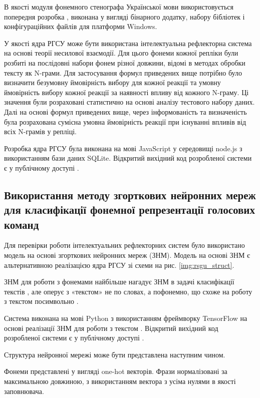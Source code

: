 В якості модуля фонемного стенографа Української мови використовується попередня розробка \cite{Pylypenko_2008}, виконана у вигляді бінарного додатку, набору бібліотек і конфігураційних файлів для платформи Windows.

У якості ядра РГСУ може бути використана інтелектуальна рефлекторна система на основі теорії несилової взаємодії. Для цього фонеми кожної репліки були розбиті на послідовні набори фонем різної довжини, відомі в методах обробки тексту як N-грами. Для застосування формул приведених вище потрібно було визначити безумовну ймовірність вибору для кожної реакції та умовну ймовірність вибору кожної реакції за наявності впливу від кожного N-граму. Ці значення були розраховані статистично на основі аналізу тестового набору даних. Далі на основі формул приведених вище, через інформованість та визначеність була розрахована сумісна умовна ймовірність реакції при існуванні впливів від всіх N-грамів у репліці.

Розробка ядра РГСУ була виконана на мові JavaScript у середовищі node.js з використанням бази даних SQLite. Відкритий вихідний код розробленої системи є у публічному доступі \cite{code1}.

\subsection{Використання методу згорткових нейронних мереж для класифікації фонемної репрезентації голосових команд}

Для перевірки роботи інтелектуальних рефлекторних систем було використано модель на основі згорткових нейронних мереж (ЗНМ). Модель на основі ЗНМ є альтернативною реалізацією ядра РГСУ зі схеми на рис. \ref{img:rsgu_struct}.

ЗНМ для роботи з фонемами найбільше нагадує ЗНМ в задачі класифікації текстів \cite{Kim_2014}, але оперує з «текстом» не по словах, а пофонемно, що схоже на роботу з текстом посимвольно \cite{Zhang_2016}.

Система виконана на мові Python з використанням фреймворку TensorFlow на основі реалізації ЗНМ для роботи з текстом \cite{Britz_2015}. Відкритий вихідний код розробленої системи є у публічному доступі \cite{code2}.

Структура нейронної мережі може бути представлена наступним чином.

Фонеми представлені у вигляді one-hot векторів. Фрази нормалізовані за максимальною довжиною, з використанням вектора з усіма нулями в якості заповнювача.

